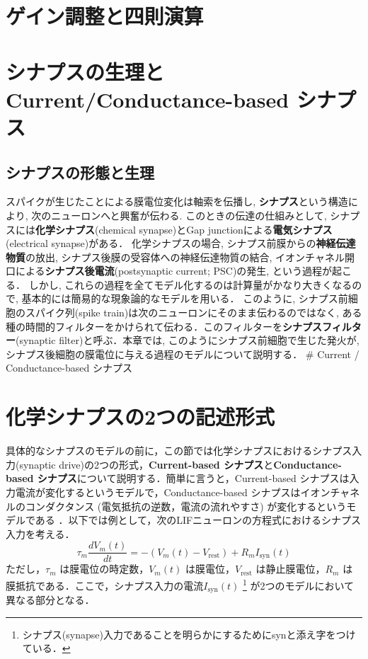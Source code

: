 \section{ゲイン調整と四則演算}
\section{シナプスの生理とCurrent/Conductance-based シナプス}
\subsection{シナプスの形態と生理}
スパイクが生じたことによる膜電位変化は軸索を伝播し, \textbf{シナプス}という構造により, 次のニューロンへと興奮が伝わる. このときの伝達の仕組みとして, シナプスには\textbf{化学シナプス}(chemical synapse)とGap junctionによる\textbf{電気シナプス}(electrical synapse)がある．  
化学シナプスの場合, シナプス前膜からの\textbf{神経伝達物質}の放出, シナプス後膜の受容体への神経伝達物質の結合, イオンチャネル開口による\textbf{シナプス後電流}(postsynaptic current; PSC)の発生, という過程が起こる．
しかし, これらの過程を全てモデル化するのは計算量がかなり大きくなるので, 基本的には簡易的な現象論的なモデルを用いる．
このように, シナプス前細胞のスパイク列(spike train)は次のニューロンにそのまま伝わるのではなく, ある種の時間的フィルターをかけられて伝わる．このフィルターを\textbf{シナプスフィルター}(synaptic filter)と呼ぶ．本章では, このようにシナプス前細胞で生じた発火が, シナプス後細胞の膜電位に与える過程のモデルについて説明する．
# Current / Conductance-based シナプス
\section{化学シナプスの2つの記述形式}
具体的なシナプスのモデルの前に，この節では化学シナプスにおけるシナプス入力(synaptic drive)の2つの形式，\textbf{Current-based シナプス}と\textbf{Conductance-based シナプス}について説明する．簡単に言うと，Current-based シナプスは入力電流が変化するというモデルで，Conductance-based シナプスはイオンチャネルのコンダクタンス (電気抵抗の逆数，電流の流れやすさ) が変化するというモデルである \citep{Cavallari2014-jx}．以下では例として，次のLIFニューロンの方程式におけるシナプス入力を考える．
\begin{equation}
\tau_m \frac{dV_{m}(t)}{dt}=-(V_{m}(t)-V_\text{rest})+R_m I_{\text{syn}}(t)    
\end{equation}
ただし，$\tau_m$ は膜電位の時定数，$V_m(t)$ は膜電位，$V_\text{rest}$ は静止膜電位，$R_m$ は膜抵抗である．ここで，シナプス入力の電流$I_{\text{syn}}(t)$ \footnote{シナプス(synapse)入力であることを明らかにするためにsynと添え字をつけている．} が2つのモデルにおいて異なる部分となる．
